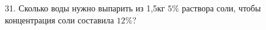 31. Сколько воды нужно выпарить из 1,5кг $5\%$ раствора соли, чтобы концентрация соли составила $12\%?$\\
